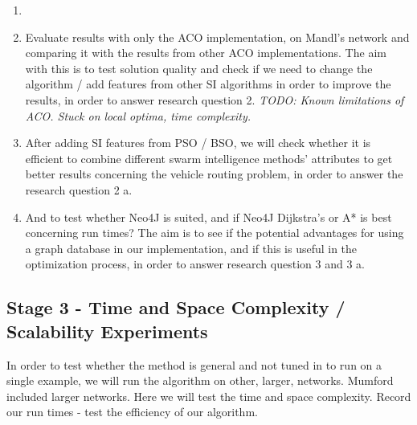 \begin{enumerate}

\item 

\item Evaluate results with only the ACO implementation, on Mandl's network and comparing it with the results from other ACO implementations. The aim with this is to test solution quality and check if we need to change the algorithm / add features from other SI algorithms in order to improve the results, in order to answer research question 2. \emph{\color{red} TODO: Known limitations of ACO. Stuck on local optima, time complexity.}

\item After adding SI features from PSO / BSO, we will check whether it is efficient to combine different swarm intelligence methods' attributes to get better results concerning the vehicle routing problem, in order to answer the research question 2 a.

\item And to test whether Neo4J is suited, and if Neo4J Dijkstra's or A* is best concerning run times? The aim is to see if the potential advantages for using a graph database in our implementation, and if this is useful in the optimization process, in order to answer research question 3 and 3 a.

\end{enumerate}

\subsection{Stage 3 - Time and Space Complexity / Scalability Experiments}

In order to test whether the method is general and not tuned in to run on a single example, we will run the algorithm on other, larger, networks. Mumford included larger networks. Here we will test the time and space complexity.
Record our run times - test the efficiency of our algorithm.



